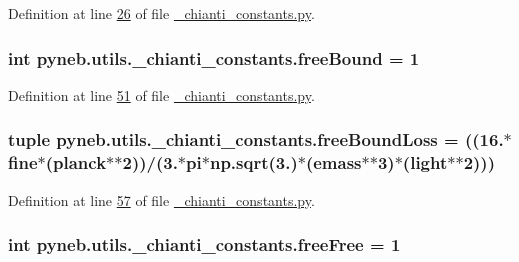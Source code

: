 Definition at line \hyperlink{__chianti__constants_8py_source_l00026}{26} of file \hyperlink{__chianti__constants_8py_source}{\-\_\-chianti\-\_\-constants.\-py}.

\hypertarget{namespacepyneb_1_1utils_1_1__chianti__constants_a4850755bf23aaa9a52f838e54df62a7d}{
\subsubsection[{free\-Bound}]{\setlength{\rightskip}{0pt plus 5cm}int pyneb.\-utils.\-\_\-chianti\-\_\-constants.\-free\-Bound = 1}}\label{namespacepyneb_1_1utils_1_1__chianti__constants_a4850755bf23aaa9a52f838e54df62a7d}


Definition at line \hyperlink{__chianti__constants_8py_source_l00051}{51} of file \hyperlink{__chianti__constants_8py_source}{\-\_\-chianti\-\_\-constants.\-py}.

\hypertarget{namespacepyneb_1_1utils_1_1__chianti__constants_a06c463c09c59b15c44e8e6a405bd81dc}{
\subsubsection[{free\-Bound\-Loss}]{\setlength{\rightskip}{0pt plus 5cm}tuple pyneb.\-utils.\-\_\-chianti\-\_\-constants.\-free\-Bound\-Loss = ((16.$\ast${\bf fine}$\ast$({\bf planck}$\ast$$\ast$2))/(3.$\ast${\bf pi}$\ast$np.\-sqrt(3.)$\ast$({\bf emass}$\ast$$\ast$3)$\ast$({\bf light}$\ast$$\ast$2)))}}\label{namespacepyneb_1_1utils_1_1__chianti__constants_a06c463c09c59b15c44e8e6a405bd81dc}


Definition at line \hyperlink{__chianti__constants_8py_source_l00057}{57} of file \hyperlink{__chianti__constants_8py_source}{\-\_\-chianti\-\_\-constants.\-py}.

\hypertarget{namespacepyneb_1_1utils_1_1__chianti__constants_acb6e045304d6339f57d58214db1f2395}{
\subsubsection[{free\-Free}]{\setlength{\rightskip}{0pt plus 5cm}int pyneb.\-utils.\-\_\-chianti\-\_\-constants.\-free\-Free = 1}}\label{namespacepyneb_1_1utils_1_1__chianti__constants_acb6e045304d6339f57d58214db1f2395}


